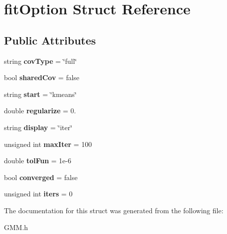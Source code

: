 \hypertarget{structfit_option}{\section{fit\+Option Struct Reference}
\label{structfit_option}
}
\subsection*{Public Attributes}
\begin{DoxyCompactItemize}
\item 
\hypertarget{structfit_option_ae1d880f6fcd26e15f07d50c77c5cceea}{string {\bfseries cov\+Type} = \char`\"{}full\char`\"{}}\label{structfit_option_ae1d880f6fcd26e15f07d50c77c5cceea}

\item 
\hypertarget{structfit_option_a2efaf3629539e3864967853058e80420}{bool {\bfseries shared\+Cov} = false}\label{structfit_option_a2efaf3629539e3864967853058e80420}

\item 
\hypertarget{structfit_option_a4c1ecd5ba984e2e12faa29217c78f931}{string {\bfseries start} = \char`\"{}kmeans\char`\"{}}\label{structfit_option_a4c1ecd5ba984e2e12faa29217c78f931}

\item 
\hypertarget{structfit_option_abffa02537679becf07413b31f5889e6f}{double {\bfseries regularize} = 0.}\label{structfit_option_abffa02537679becf07413b31f5889e6f}

\item 
\hypertarget{structfit_option_acd949efbbb51ddf447d4cb86fd2ac901}{string {\bfseries display} = \char`\"{}iter\char`\"{}}\label{structfit_option_acd949efbbb51ddf447d4cb86fd2ac901}

\item 
\hypertarget{structfit_option_a54d1906ece53c348047c8b404ff06053}{unsigned int {\bfseries max\+Iter} = 100}\label{structfit_option_a54d1906ece53c348047c8b404ff06053}

\item 
\hypertarget{structfit_option_a4523efadc5bc4f29cd1648ac4ca018dd}{double {\bfseries tol\+Fun} = 1e-\/6}\label{structfit_option_a4523efadc5bc4f29cd1648ac4ca018dd}

\item 
\hypertarget{structfit_option_a600d82e88e845abb5a442f80eecf89cb}{bool {\bfseries converged} = false}\label{structfit_option_a600d82e88e845abb5a442f80eecf89cb}

\item 
\hypertarget{structfit_option_a711048d488fccee5740b31e4149c46de}{unsigned int {\bfseries iters} = 0}\label{structfit_option_a711048d488fccee5740b31e4149c46de}

\end{DoxyCompactItemize}


The documentation for this struct was generated from the following file\+:\begin{DoxyCompactItemize}
\item 
G\+M\+M.\+h\end{DoxyCompactItemize}
